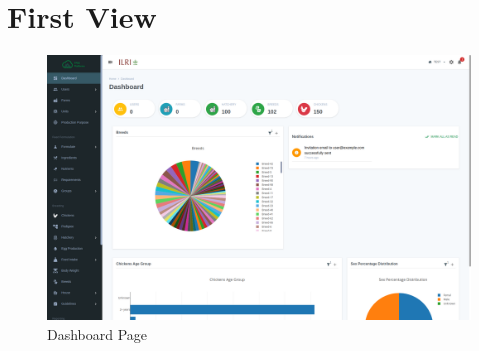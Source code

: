 \section{First View}\label{sec:first_view}
\begin{figure}[h!]
  	\includegraphics[width=15cm]{screenshots/dashboard_page.png}
  	\caption{Dashboard Page}
  	\label{fig:dashboard_page}
\end{figure}